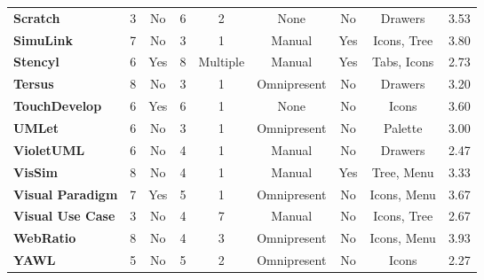 \begin{table*}
{\begin{tabular}{l|cccccccc}
      \textbf{Scratch}    & 3	& No	& 6	& 2	& None	& No	& Drawers	& 3.53			\\[1ex]
      \textbf{SimuLink}    & 7	& No	& 3	& 1	& Manual	& Yes	& Icons, Tree	& 3.80			\\[1ex]
      \textbf{Stencyl}    & 6	& Yes	& 8	& Multiple	& Manual	& Yes	& Tabs, Icons	& 2.73			\\[1ex]
      \textbf{Tersus}    & 8	& No	& 3	& 1	& Omnipresent	& No	& Drawers	& 3.20			\\[1ex]
      \textbf{TouchDevelop}    & 6	& Yes	& 6	& 1	& None	& No	& Icons	& 3.60			\\[1ex]
      \textbf{UMLet}    & 6	& No	& 3	& 1	& Omnipresent	& No	& Palette	& 3.00			\\[1ex]
      \textbf{VioletUML}    & 6	& No	& 4	& 1	& Manual	& No	& Drawers	& 2.47			\\[1ex]
      \textbf{VisSim}    & 8	& No	& 4	& 1	& Manual	& Yes	& Tree, Menu	& 3.33			\\[1ex]
      \textbf{Visual Paradigm}    & 7	& Yes	& 5	& 1	& Omnipresent	& No	& Icons, Menu	& 3.67			\\[1ex]
      \textbf{Visual Use Case}    & 3	& No	& 4	& 7	& Manual	& No	& Icons, Tree	& 2.67			\\[1ex]
      \textbf{WebRatio}    & 8	& No	& 4	& 3	& Omnipresent	& No	& Icons, Menu	& 3.93			\\[1ex]
      \textbf{YAWL}    & 5	& No	& 5	& 2	& Omnipresent	& No	& Icons	& 2.27			\\[1ex]
		\end{tabular}}
	\caption{Measure of the chrome of \acp{ide}.}
	\label{tab:chrome}
\end{table*}
%
